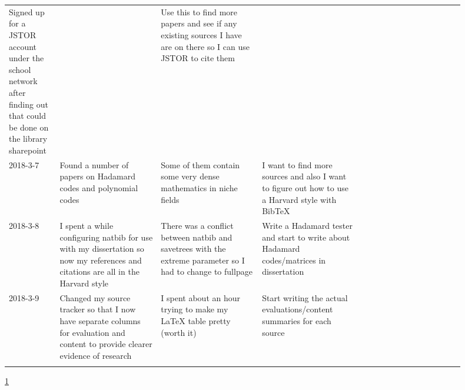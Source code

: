 \documentclass{article}
\begin{document}
\begin{center}
{\begin{longtable}{p{0.1\linewidth} p{0.2\linewidth} p{0.2\linewidth} p{0.2\linewidth} p{0.2\linewidth}}
    Signed up for a JSTOR account under the school network after finding out
    that could be done on the library sharepoint &

    &

    Use this to find more papers and see if any existing sources I have are on
    there so I can use JSTOR to cite them &

    \\ 2018-3-7 &

    Found a number of papers on Hadamard codes and polynomial codes &

    Some of them contain some very dense mathematics in niche fields &

    I want to find more sources and also I want to figure out how to use a
    Harvard style with BibTeX &

    \\ 2018-3-8 &

    I spent a while configuring natbib for use with my dissertation so now my
    references and citations are all in the Harvard style &

    There was a conflict between natbib and savetrees with the extreme
    parameter so I had to change to fullpage &

    Write a Hadamard tester and start to write about Hadamard codes/matrices in
    dissertation &

    \\ 2018-3-9 &

    Changed my source tracker so that I now have separate columns for
    evaluation and content to provide clearer evidence of research &

    I spent about an hour trying to make my LaTeX table pretty (worth it) &

    Start writing the actual evaluations/content summaries for each source &

    \\

    \bottomrule
    \label{tab:sourceeval}
    \end{longtable}
    }

    \ref{tab:sourceeval}
    \end{center}
\end{document}
